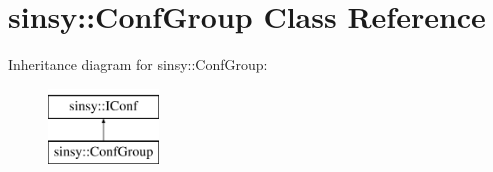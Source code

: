 \hypertarget{classsinsy_1_1ConfGroup}{\section{sinsy\-:\-:\-Conf\-Group \-Class \-Reference}
\label{classsinsy_1_1ConfGroup}
}
\-Inheritance diagram for sinsy\-:\-:\-Conf\-Group\-:\begin{figure}[H]
\begin{center}
\leavevmode
\includegraphics[height=2.000000cm]{classsinsy_1_1ConfGroup}
\end{center}
\end{figure}
